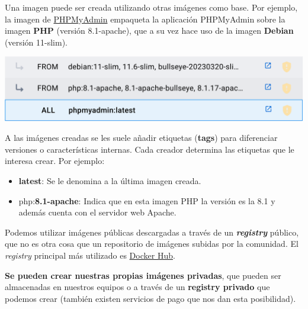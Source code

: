 
Una imagen puede ser creada utilizando otras imágenes como base. Por ejemplo, la imagen de \href{https://hub.docker.com/_/phpmyadmin}{PHPMyAdmin} empaqueta la aplicación PHPMyAdmin sobre la imagen \textbf{PHP} (versión 8.1-apache), que a su vez hace uso de la imagen \textbf{Debian} (versión 11-slim).


\begin{center}
    \includegraphics[width=0.9\linewidth]{img/docker/imagen1.png}
\end{center}

A las imágenes creadas se les suele añadir etiquetas (\textbf{tags}) para diferenciar versiones o características internas. Cada creador determina las etiquetas que le interesa crear. Por ejemplo:
\begin{itemize}
    \item \textbf{latest}: Se le denomina a la última imagen creada.
    \item php:\textbf{8.1-apache}: Indica que en esta imagen PHP la versión es la 8.1 y además cuenta con el servidor web Apache.
\end{itemize}

Podemos utilizar imágenes públicas descargadas a través de un \textbf{\textit{registry}} público, que no es otra cosa que un repositorio de imágenes subidas por la comunidad. El \textit{registry} principal más utilizado es \href{https://hub.docker.com/}{Docker Hub}.


\textbf{Se pueden crear nuestras propias imágenes privadas}, que pueden ser almacenadas en nuestros equipos o a través de un \textbf{registry privado} que podemos crear (también existen servicios de pago que nos dan esta posibilidad).


